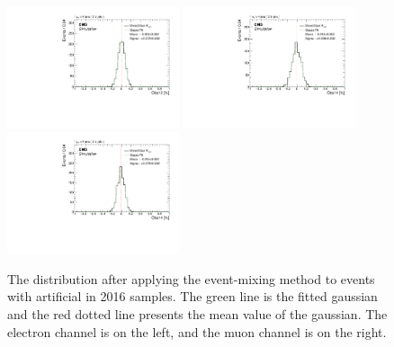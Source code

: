 \begin{figure}
    \includegraphics[width=0.45\textwidth]{figure/SimAcp_16_mu_Obs12_Acp_10_mixed.pdf}
    \includegraphics[width=0.45\textwidth]{figure/SimAcp_16_el_Obs14_Acp_10_mixed.pdf}
    \includegraphics[width=0.45\textwidth]{figure/SimAcp_16_mu_Obs14_Acp_10_mixed.pdf}
    \caption[The \Acpprime distribution after applying the event-mixing method to \ttbar events in 2016 samples.]
    {
        The \Acpprime distribution after applying the event-mixing method to \ttbar events with artificial \Acpprime in 2016 samples. 
        The green line is the fitted gaussian and the red dotted line presents the mean value of the gaussian.
        The electron channel is on the left, and the muon channel is on the right.
    }
    \label{fig:16_exchanging_simulation_acp}
\end{figure}
